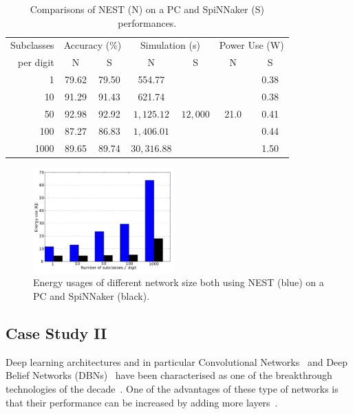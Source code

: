 \documentclass{frontiersENG} %
\begin{document}
\begin{table}[h]
	\caption{Comparisons of NEST (N) on a PC and SpiNNaker (S) performances.}
	\begin{center}
		\begin{tabular} {r|c|c|c|c|c|c}
			Subclasses
			&\multicolumn{2}{c|}{Accuracy (\%)}  &\multicolumn{2}{c|}{Simulation (s)}
			&\multicolumn{2}{c}{Power Use (W)}   \\
			\cline{2-7}
			per digit
			& N & S & N & S & N & S\\
			\hline
			1 & 79.62 & 79.50 & 554.77 & \multirow{5}{*}{$12,000$} & \multirow{5}{*}{ 21.0 } & 0.38 \\
			10 & 91.29 & 91.43 & 621.74 &   &   & 0.38 \\
			50 & 92.98 & 92.92 & $1,125.12$ &   &   & 0.41 \\
			100 & 87.27 & 86.83 & $1,406.01$ &   &   & 0.44 \\
			1000 & 89.65 & 89.74 & $30,316.88$ &   &   & 1.50 \\
			
		\end{tabular}
		\label{tbl:compare}
	\end{center}
\end{table}

\begin{figure}[hbt!]
	\centering
	\includegraphics[width=0.48\textwidth]{energy}
	\caption{Energy usages of different network size both using NEST (blue) on a PC and SpiNNaker (black).}
	\label{fig:energy}
\end{figure}
\subsection{Case Study II}
Deep learning architectures and in particular Convolutional Networks~\citep{lecun1998gradient} and Deep Belief Networks (DBNs)~\citep{hinton2006fast} have been characterised as one of the breakthrough technologies of the decade~\citep{MIT_TechReview}. One of the advantages of these type of networks is that their performance can be increased by adding more layers~\citep{hinton2006fast}.
\end{document}

